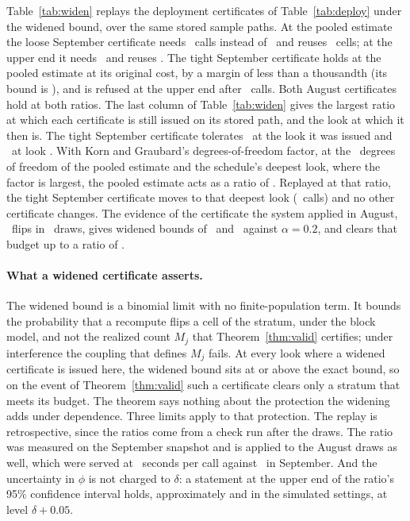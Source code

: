 Table~\ref{tab:widen} replays the deployment certificates of
Table~\ref{tab:deploy} under the widened bound, over the same stored
sample paths. At the pooled estimate the loose September certificate
needs \widenSepLooseCallsEst\ calls instead of \sepOracleLoose\ and
reuses \widenSepLooseReusedEst\ cells; at the upper end it needs
\widenSepLooseCallsHi\ and reuses \widenSepLooseReusedHi. The tight
September certificate holds at the pooled estimate at its original cost,
by a margin of less than a thousandth (its bound is
\widenSepTightBoundEst), and is refused at the upper end after
\widenSepTightCallsHi\ calls. Both August certificates hold at both
ratios. The last column of Table~\ref{tab:widen} gives the largest ratio
at which each certificate is still issued on its stored path, and the
look at which it then is. The tight September certificate tolerates
\widenSepTightPhiIssued\ at the look it was issued and
\widenSepTightPhiBest\ at look \widenSepTightPhiBestLook. With Korn and
Graubard's degrees-of-freedom factor, at the \indepPooledDf\ degrees of
freedom of the pooled estimate and the schedule's deepest look, where
the factor is largest, the pooled estimate acts as a ratio of
\widenDfPhi. Replayed at that ratio, the tight September certificate
moves to that deepest look (\widenDfTightCalls\ calls) and no other
certificate changes. The evidence of the certificate the system applied
in August, \deployMpFlipsLoose\ flips in \deployMpLookLoose\ draws,
gives widened bounds of \widenAppliedEst\ and \widenAppliedHi\ against
$\alpha{=}0.2$, and clears that budget up to a ratio of
\widenAppliedPhi.

\keeprunin
\paragraph{What a widened certificate asserts.} The widened bound is a
binomial limit with no finite-population term. It bounds the probability
that a recompute flips a cell of the stratum, under the block model, and
not the realized count $M_j$ that Theorem~\ref{thm:valid} certifies;
under interference the coupling that defines $M_j$ fails. At every look
where a widened certificate is issued here, the widened bound sits at
or above the exact bound, so on the event of Theorem~\ref{thm:valid}
such a certificate clears only a stratum that meets its budget. The
theorem says nothing about the protection the widening adds under
dependence. Three limits apply to that protection. The replay is
retrospective, since the ratios come from a check run after the draws.
The ratio was measured on the September snapshot and is applied to the
August draws as well, which were served at \driftLatencyAug\ seconds per
call against \driftLatencySep\ in September. And the uncertainty in
$\phi$ is not charged to $\delta$: a statement at the upper end of the
ratio's 95\% confidence interval holds, approximately and in the
simulated settings, at level $\delta + 0.05$.

